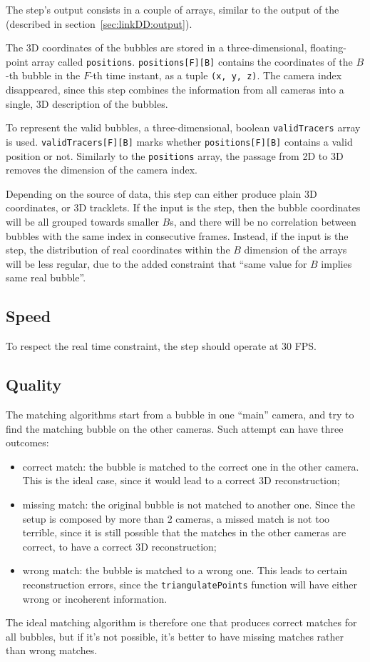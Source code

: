 The \match* step's output consists in a couple of arrays, similar to the output of the \linkDD* (described in section~\ref{sec:linkDD:output}).

The 3D coordinates of the bubbles are stored in a three-dimensional, floating-point array called \texttt{positions}. \texttt{positions[F][B]} contains the coordinates of the $B$-th bubble in the $F$-th time instant, as a tuple \texttt{(x, y, z)}.
The camera index disappeared, since this step combines the information from all cameras into a single, 3D description of the bubbles.

To represent the valid bubbles, a three-dimensional, boolean \texttt{validTracers} array is used.
\texttt{validTracers[F][B]} marks whether \texttt{positions[F][B]} contains a valid position or not.
Similarly to the \texttt{positions} array, the passage from 2D to 3D removes the dimension of the camera index.

Depending on the source of data, this step can either produce plain 3D coordinates, or 3D tracklets.
If the input is the \locate* step, then the bubble coordinates will be all grouped towards smaller $B$s, and there will be no correlation between bubbles with the same index in consecutive frames.
Instead, if the input is the \linkDD* step, the distribution of real coordinates within the $B$ dimension of the arrays will be less regular, due to the added constraint that ``same value for $B$ implies same real bubble''.

\subsection{Speed}

To respect the real time constraint, the \match* step should operate at 30 FPS.

\subsection{Quality}

The matching algorithms start from a bubble in one ``main'' camera, and try to find the matching bubble on the other cameras.
Such attempt can have three outcomes:
\begin{itemize}
	\itemsep 0em
	\item correct match: the bubble is matched to the correct one in the other camera. This is the ideal case, since it would lead to a correct 3D reconstruction;
	\item missing match: the original bubble is not matched to another one. Since the setup is composed by more than 2 cameras, a missed match is not too terrible, since it is still possible that the matches in the other cameras are correct, to have a correct 3D reconstruction;
	\item wrong match: the bubble is matched to a wrong one. This leads to certain reconstruction errors, since the \texttt{triangulatePoints} function will have either wrong or incoherent information.
\end{itemize}
The ideal matching algorithm is therefore one that produces correct matches for all bubbles, but if it's not possible, it's better to have missing matches rather than wrong matches.

